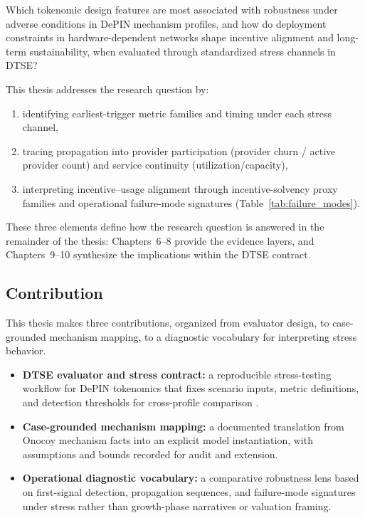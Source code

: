 Which tokenomic design features are most associated with robustness under adverse conditions in DePIN mechanism profiles, and how do deployment constraints in hardware-dependent networks shape incentive alignment and long-term sustainability, when evaluated through standardized stress channels in DTSE?

This thesis addresses the research question by:
\begin{enumerate}
    \item identifying earliest-trigger metric families and timing under each stress channel,
    \item tracing propagation into provider participation (provider churn / active provider count) and service continuity (utilization/capacity),
    \item interpreting incentive--usage alignment through incentive-solvency proxy families and operational failure-mode signatures (Table~\ref{tab:failure_modes}).
\end{enumerate}

These three elements define how the research question is answered in the remainder of the thesis: Chapters~6--8 provide the evidence layers, and Chapters~9--10 synthesize the implications within the DTSE contract.

\subsection{Contribution}
This thesis makes three contributions, organized from evaluator design, to case-grounded mechanism mapping, to a diagnostic vocabulary for interpreting stress behavior.

\begin{itemize}
    \item \textbf{DTSE evaluator and stress contract:} a reproducible stress-testing workflow for DePIN tokenomics that fixes scenario inputs, metric definitions, and detection thresholds for cross-profile comparison \cite{Sollaci2004, Morris2019}.
    \item \textbf{Case-grounded mechanism mapping:} a documented translation from Onocoy mechanism facts into an explicit model instantiation, with assumptions and bounds recorded for audit and extension.
    \item \textbf{Operational diagnostic vocabulary:} a comparative robustness lens based on first-signal detection, propagation sequences, and failure-mode signatures under stress rather than growth-phase narratives or valuation framing.
\end{itemize}

